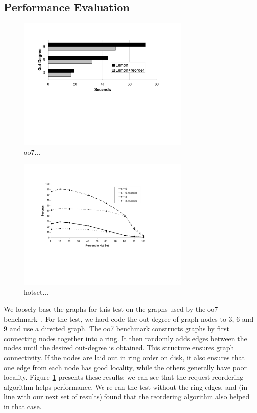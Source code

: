 \documentclass[10pt,letterpaper,twocolumn,english]{article}
\newcommand{\yad}{Lemon\xspace}
\begin{document}

\subsection {Performance Evaluation}

\begin{figure}[t]
\includegraphics[width=3.3in]{oo7.pdf}
\caption{\sf\label{fig:oo7} oo7...}
\end{figure}

\begin{figure}[t]
\includegraphics[width=3.3in]{trans-closure-hotset.pdf}
\caption{\sf\label{fig:hotGraph} hotset...}
\end{figure}

We loosely base the graphs for this test on the graphs used by the oo7
benchmark~\cite{oo7}.  For the test, we hard code the out-degree of
graph nodes to 3, 6 and 9 and use a directed graph.  The oo7 benchmark
constructs graphs by first connecting nodes together into a ring.  It
then randomly adds edges between the nodes until the desired out-degree
is obtained.  This structure ensures graph connectivity.  If the nodes
are laid out in ring order on disk, it also ensures that one edge
from each node has good locality, while the others generally have poor
locality.  
Figure~\ref{fig:oo7} presents these results;  we can see that the request reordering algorithm
helps performance.  We re-ran the test without the ring edges, and (in
line with our next set of results) found that the reordering algorithm
also helped in that case.
\end{document}
